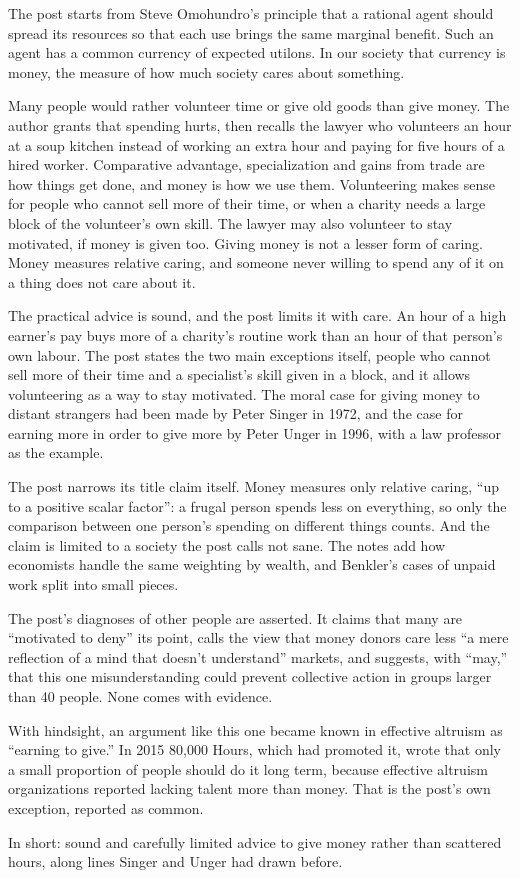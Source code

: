 \begin{afterword}
\summaryhead

The post starts from Steve Omohundro's principle that a rational agent should spread its resources so that each use brings the same marginal benefit. Such an agent has a common currency of expected utilons. In our society that currency is money, the measure of how much society cares about something.

Many people would rather volunteer time or give old goods than give money. The author grants that spending hurts, then recalls the lawyer who volunteers an hour at a soup kitchen instead of working an extra hour and paying for five hours of a hired worker. Comparative advantage, specialization and gains from trade are how things get done, and money is how we use them. Volunteering makes sense for people who cannot sell more of their time, or when a charity needs a large block of the volunteer's own skill. The lawyer may also volunteer to stay motivated, if money is given too. Giving money is not a lesser form of caring. Money measures relative caring, and someone never willing to spend any of it on a thing does not care about it.

\responsehead

The practical advice is sound, and the post limits it with care. An hour of a high earner's pay buys more of a charity's routine work than an hour of that person's own labour. The post states the two main exceptions itself, people who cannot sell more of their time and a specialist's skill given in a block, and it allows volunteering as a way to stay motivated. The moral case for giving money to distant strangers had been made by Peter Singer in 1972, and the case for earning more in order to give more by Peter Unger in 1996, with a law professor as the example.

The post narrows its title claim itself. Money measures only relative caring, ``up to a positive scalar factor'': a frugal person spends less on everything, so only the comparison between one person's spending on different things counts. And the claim is limited to a society the post calls not sane. The notes add how economists handle the same weighting by wealth, and Benkler's cases of unpaid work split into small pieces.

The post's diagnoses of other people are asserted. It claims that many are ``motivated to deny'' its point, calls the view that money donors care less ``a mere reflection of a mind that doesn't understand'' markets, and suggests, with ``may,'' that this one misunderstanding could prevent collective action in groups larger than 40 people. None comes with evidence.

With hindsight, an argument like this one became known in effective altruism as ``earning to give.'' In 2015 80,000 Hours, which had promoted it, wrote that only a small proportion of people should do it long term, because effective altruism organizations reported lacking talent more than money. That is the post's own exception, reported as common.

In short: sound and carefully limited advice to give money rather than scattered hours, along lines Singer and Unger had drawn before.
\end{afterword}
